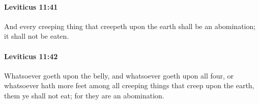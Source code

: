 		\paragraph{Leviticus 11:41} %
			\label{LEVITICUS-11-41}

			And every creeping thing that creepeth upon the earth shall be an abomination; it shall not be eaten.


		\paragraph{Leviticus 11:42} %
			\label{LEVITICUS-11-42}

			Whatsoever goeth upon the belly, and whatsoever goeth upon all four, or whatsoever hath more feet among all creeping things that creep upon the earth, them ye shall not eat; for they are an abomination.


